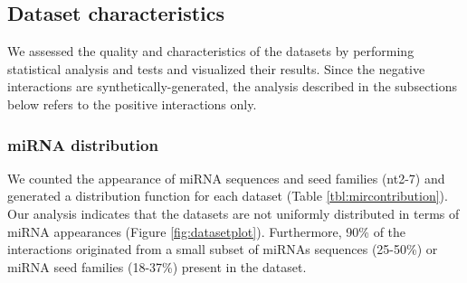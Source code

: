 \documentclass{bmcart}
\begin{document}
\subsection*{Dataset characteristics}
We assessed the quality and characteristics of the datasets by performing statistical analysis and tests and visualized their results. Since the negative interactions are synthetically-generated, the analysis described in the subsections below refers to the positive interactions only.






\subsubsection*{miRNA distribution}
We counted the appearance of miRNA sequences and seed families (nt2-7) and generated a distribution function for each dataset (Table \ref{tbl:mircontribution}). Our analysis indicates that the datasets are not uniformly distributed in terms of miRNA appearances (Figure \ref{fig:datasetplot}). Furthermore, 90\% of the interactions originated from a small subset of miRNAs sequences (25-50\%) or miRNA seed families (18-37\%) present in the dataset.

\end{document}
